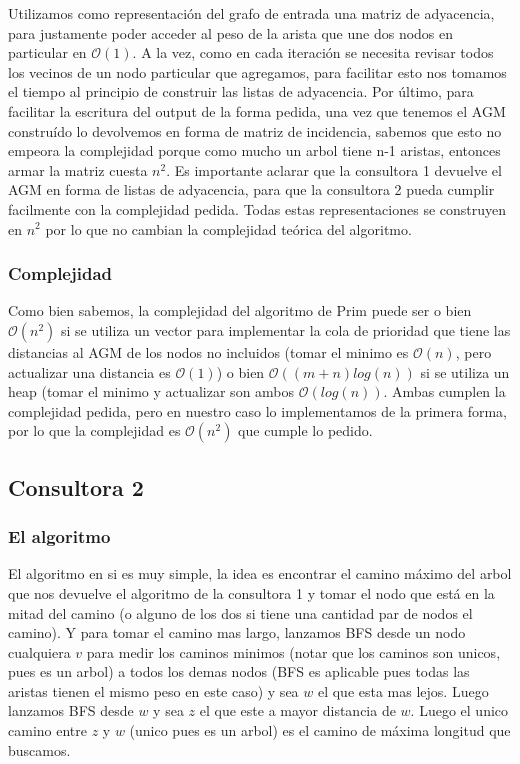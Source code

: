 \documentclass[A4paper,oneside,fleqn,11pt]{article}
\theoremstyle{definition}
\begin{document}
Utilizamos como representación del grafo de entrada una matriz de adyacencia, para justamente poder acceder al peso de la arista que une dos nodos en particular en $\mathcal{O} (1)$. A la vez, como en cada iteración se necesita revisar todos los vecinos de un nodo particular que agregamos, para facilitar esto nos tomamos el tiempo al principio de construir las listas de adyacencia. Por último, para facilitar la escritura del output de la forma pedida, una vez que tenemos el AGM construído lo devolvemos en forma de matriz de incidencia, sabemos que esto no empeora la complejidad porque como mucho un arbol tiene n-1 aristas, entonces armar la matriz cuesta $n^2$. Es importante aclarar que la consultora 1 devuelve el AGM en forma de listas de adyacencia, para que la consultora 2 pueda cumplir facilmente con la complejidad pedida. Todas estas representaciones se construyen en $n^2$ por lo que no cambian la complejidad teórica del algoritmo.


\subsubsection{Complejidad}

Como bien sabemos, la complejidad del algoritmo de Prim puede ser o bien $\mathcal{O} (n^2)$ si se utiliza un vector para implementar la cola de prioridad que tiene las distancias al AGM de los nodos no incluidos (tomar el minimo es $\mathcal{O} (n)$, pero actualizar una distancia es $\mathcal{O} (1)$) o bien $\mathcal{O} ((m+n) log(n))$ si se utiliza un heap (tomar el minimo y actualizar son ambos $\mathcal{O} (log(n))$. Ambas cumplen la complejidad pedida, pero en nuestro caso lo implementamos de la primera forma, por lo que la complejidad es $\mathcal{O} (n^2)$ que cumple lo pedido.

\subsection{Consultora 2}


\subsubsection{El algoritmo}
El algoritmo en si es muy simple, la idea es encontrar el camino máximo del arbol que nos devuelve el algoritmo de la consultora 1 y tomar el nodo que está en la mitad del camino (o alguno de los dos si tiene una cantidad par de nodos el camino). Y para tomar el camino mas largo, lanzamos BFS desde un nodo cualquiera $v$ para medir los caminos minimos (notar que los caminos son unicos, pues es un arbol) a todos los demas nodos (BFS es aplicable pues todas las aristas tienen el mismo peso en este caso) y sea $w$ el que esta mas lejos. Luego lanzamos BFS desde $w$ y sea $z$ el que este a mayor distancia de $w$. Luego el unico camino entre $z$ y $w$ (unico pues es un arbol) es el camino de máxima longitud que buscamos.
\end{document}
